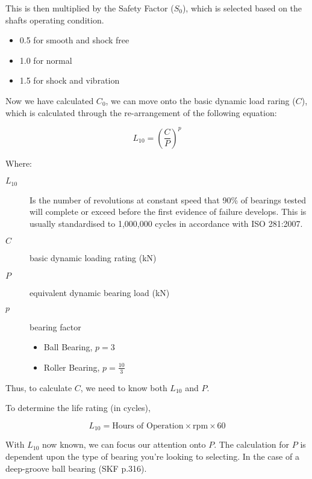 This is then multiplied by the Safety Factor (\(S_0\)), which is selected based on the shafts operating condition.

\begin{itemize}
    \item 0.5 for smooth and shock free
    \item 1.0 for normal
    \item 1.5 for shock and vibration
\end{itemize}

Now  we have calculated \(C_0\), we can move onto the basic dynamic load raring (\(C\)), which is calculated through the re-arrangement of the following equation:

\begin{equation}
    L_{10} = \left(\frac{C}{P}\right)^p
    \label{equ-bearing-life}
\end{equation}

\noindent{} Where:

\begin{description}
    \item[\(L_{10}\)] Is the number of revolutions at constant speed that 90\% of bearings tested will complete or exceed before the first evidence of failure develops. This is usually standardised to 1,000,000 cycles in accordance with ISO 281:2007.
    \item[\(C\)] basic dynamic loading rating (\si{\kilo\newton})
    \item[\(P\)] equivalent dynamic bearing load (\si{\kilo\newton})
    \item[\(p\)] bearing factor
    \begin{itemize}
        \item Ball Bearing, \(p=3\)
        \item Roller Bearing, \(p=\frac{10}{3}\)
    \end{itemize}
\end{description}

Thus, to calculate \(C\), we need to know both \(L_{10}\) and \(P\).

To determine the life rating (in cycles),

\begin{equation}
    L_{10} = \text{Hours of Operation} \times \text{rpm} \times 60
\end{equation}

With \(L_{10}\) now known, we can focus our attention onto \(P\). The calculation for \(P\) is dependent upon the type of bearing you're looking to selecting. In the case of a deep-groove ball bearing (SKF p.316).

